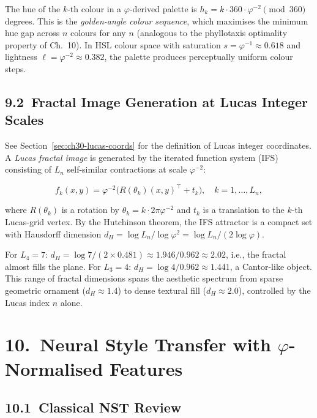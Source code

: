 The hue of the $k$-th colour in a $\varphi$-derived
palette is $h_k = k \cdot 360 \cdot \varphi^{-2}
\pmod{360}$ degrees.  This is the
\emph{golden-angle colour sequence}, which
maximises the minimum hue gap across $n$ colours
for any $n$ (analogous to the phyllotaxis
optimality property of Ch.~10).  In HSL colour
space with saturation $s = \varphi^{-1} \approx 0.618$
and lightness $\ell = \varphi^{-2} \approx 0.382$,
the palette produces perceptually uniform colour
steps.

\subsection{9.2\ Fractal Image Generation at
  Lucas Integer Scales}\label{subsec:ch30-fractal}

See Section~\ref{sec:ch30-lucas-coords} for the
definition of Lucas integer coordinates.  A
\emph{Lucas fractal image} is generated by the
iterated function system (IFS) consisting of
$L_n$ self-similar contractions at scale $\varphi^{-2}$:

\[f_k(x, y) = \varphi^{-2}
  \bigl(R(\theta_k) (x, y)^\top + t_k\bigr),
  \quad k = 1, \ldots, L_n,\]

where $R(\theta_k)$ is a rotation by
$\theta_k = k \cdot 2\pi \varphi^{-2}$ and
$t_k$ is a translation to the $k$-th Lucas-grid
vertex.  By the Hutchinson theorem, the IFS
attractor is a compact set with Hausdorff
dimension $d_H = \log L_n / \log \varphi^{2}
= \log L_n / (2\log\varphi)$.

For $L_4 = 7$: $d_H = \log 7 / (2 \times 0.481)
\approx 1.946/0.962 \approx 2.02$, i.e., the
fractal almost fills the plane.
For $L_3 = 4$: $d_H = \log 4 / 0.962
\approx 1.441$, a Cantor-like object.
This range of fractal dimensions spans the
aesthetic spectrum from sparse geometric
ornament ($d_H \approx 1.4$) to dense textural
fill ($d_H \approx 2.0$), controlled by the
Lucas index $n$ alone.

\section{10.\ Neural Style Transfer with
  $\varphi$-Normalised Features}%
  \label{sec:ch30-nst}

\subsection{10.1\ Classical NST
  Review}\label{subsec:ch30-nst-review}

